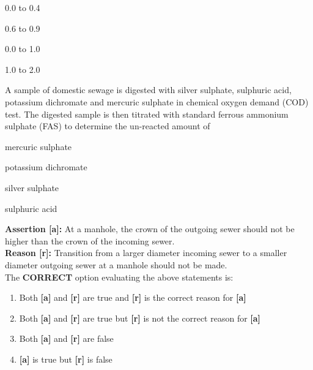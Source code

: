 \begin{enumerate}
\begin{multicols}{4}
    \item 0.0 to 0.4
    \item 0.6 to 0.9
    \item 0.0 to 1.0
    \item 1.0 to 2.0
    \end{multicols}
\end{enumerate}

\item A sample of domestic sewage is digested with silver sulphate, sulphuric acid, potassium dichromate and mercuric sulphate in chemical oxygen demand (COD) test. The digested sample is then titrated with standard ferrous ammonium sulphate (FAS) to determine the un-reacted amount of

\begin{enumerate}
\begin{multicols}{2}
    \item mercuric sulphate
    \columnbreak
    \item potassium dichromate
    \end{multicols}
    \begin{multicols}{2}
    \item silver sulphate
    \item sulphuric acid
    \end{multicols}
\end{enumerate}

\item \textbf{Assertion [a]:} At a manhole, the crown of the outgoing sewer should not be higher than the crown of the incoming sewer. \\
\textbf{Reason [r]:}   Transition from a larger diameter incoming sewer to a smaller diameter outgoing sewer at a manhole should not be made. \\
The \textbf{CORRECT} option evaluating the above statements is:

\begin{enumerate}
    \item Both \textbf{[a]} and \textbf{[r]} are true and \textbf{[r]} is the correct reason for \textbf{[a]}
    \item Both \textbf{[a]} and \textbf{[r]} are true but \textbf{[r]} is not the correct reason for \textbf{[a]}
    \item Both \textbf{[a]} and \textbf{[r]} are false
    \item \textbf{[a]} is true but \textbf{[r]} is false
\end{enumerate}

